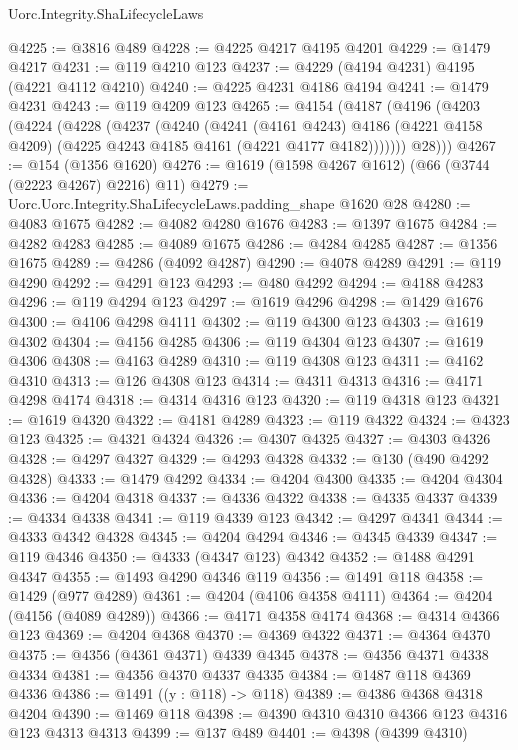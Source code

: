 \begin{lexlean}{Uorc.Integrity.ShaLifecycleLaws}
\begin{coremodule}
@4225 := @3816 @489
@4228 := @4225 @4217 @4195 @4201
@4229 := @1479 @4217
@4231 := @119 @4210 @123
@4237 := @4229 (@4194 @4231) @4195 (@4221 @4112 @4210)
@4240 := @4225 @4231 @4186 @4194
@4241 := @1479 @4231
@4243 := @119 @4209 @123
@4265 := @4154
    (@4187
      (@4196
        (@4203
          (@4224
            (@4228
              (@4237
                (@4240
                  (@4241
                    (@4161 @4243)
                    @4186
                    (@4221 @4158 @4209)
                    (@4225 @4243 @4185 @4161 (@4221 @4177 @4182)))))))
          @28)))
@4267 := @154 (@1356 @1620)
@4276 := @1619 (@1598 @4267 @1612) (@66 (@3744 (@2223 @4267) @2216) @11)
@4279 := Uorc.Uorc.Integrity.ShaLifecycleLaws.padding_shape @1620 @28
@4280 := @4083 @1675
@4282 := @4082 @4280 @1676
@4283 := @1397 @1675
@4284 := @4282 @4283
@4285 := @4089 @1675
@4286 := @4284 @4285
@4287 := @1356 @1675
@4289 := @4286 (@4092 @4287)
@4290 := @4078 @4289
@4291 := @119 @4290
@4292 := @4291 @123
@4293 := @480 @4292
@4294 := @4188 @4283
@4296 := @119 @4294 @123
@4297 := @1619 @4296
@4298 := @1429 @1676
@4300 := @4106 @4298 @4111
@4302 := @119 @4300 @123
@4303 := @1619 @4302
@4304 := @4156 @4285
@4306 := @119 @4304 @123
@4307 := @1619 @4306
@4308 := @4163 @4289
@4310 := @119 @4308 @123
@4311 := @4162 @4310
@4313 := @126 @4308 @123
@4314 := @4311 @4313
@4316 := @4171 @4298 @4174
@4318 := @4314 @4316 @123
@4320 := @119 @4318 @123
@4321 := @1619 @4320
@4322 := @4181 @4289
@4323 := @119 @4322
@4324 := @4323 @123
@4325 := @4321 @4324
@4326 := @4307 @4325
@4327 := @4303 @4326
@4328 := @4297 @4327
@4329 := @4293 @4328
@4332 := @130 (@490 @4292 @4328)
@4333 := @1479 @4292
@4334 := @4204 @4300
@4335 := @4204 @4304
@4336 := @4204 @4318
@4337 := @4336 @4322
@4338 := @4335 @4337
@4339 := @4334 @4338
@4341 := @119 @4339 @123
@4342 := @4297 @4341
@4344 := @4333 @4342 @4328
@4345 := @4204 @4294
@4346 := @4345 @4339
@4347 := @119 @4346
@4350 := @4333 (@4347 @123) @4342
@4352 := @1488 @4291 @4347
@4355 := @1493 @4290 @4346 @119
@4356 := @1491 @118
@4358 := @1429 (@977 @4289)
@4361 := @4204 (@4106 @4358 @4111)
@4364 := @4204 (@4156 (@4089 @4289))
@4366 := @4171 @4358 @4174
@4368 := @4314 @4366 @123
@4369 := @4204 @4368
@4370 := @4369 @4322
@4371 := @4364 @4370
@4375 := @4356 (@4361 @4371) @4339 @4345
@4378 := @4356 @4371 @4338 @4334
@4381 := @4356 @4370 @4337 @4335
@4384 := @1487 @118 @4369 @4336
@4386 := @1491 ((y : @118) -> @118)
@4389 := @4386 @4368 @4318 @4204
@4390 := @1469 @118
@4398 := @4390 @4310 @4310 @4366 @123 @4316 @123 @4313 @4313
@4399 := @137 @489
@4401 := @4398 (@4399 @4310)

\end{coremodule}
\end{lexlean}
